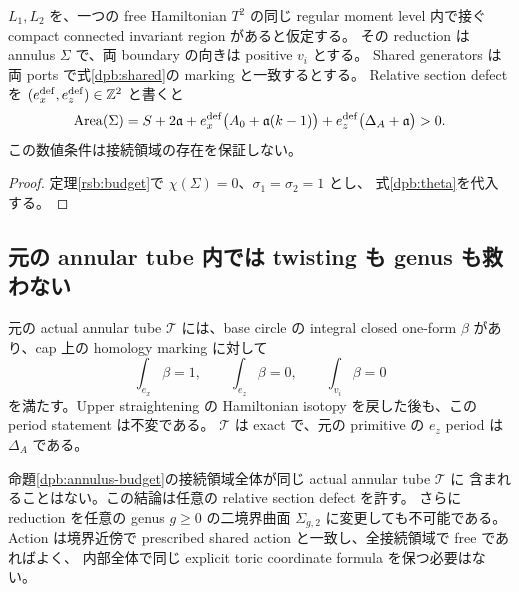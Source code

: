 \begin{proposition}\label{dpb:annulus-budget}
$L_1,L_2$ を、一つの free Hamiltonian $T^2$ の同じ regular moment level 内で接ぐ
compact connected invariant region があると仮定する。
その reduction は annulus $\Sigma$ で、両 boundary の向きは positive $v_i$ とする。
Shared generators は両 ports で式\eqref{dpb:shared}の marking と一致するとする。
Relative section defect を $(e_x^{\rm def},e_z^{\rm def})\in\mathbb Z^2$ と書くと
\begin{equation}\label{dpb:annulus-area}
 \operatorname{Area}(\Sigma)
 =S+2\mathfrak a
  +e_x^{\rm def}\bigl(A_0+\mathfrak a(k-1)\bigr)
  +e_z^{\rm def}\bigl(\Delta_A+\mathfrak a\bigr)>0.
\end{equation}
この数値条件は接続領域の存在を保証しない。
\end{proposition}

\begin{proof}
定理\ref{rsb:budget}で $\chi(\Sigma)=0$、$\sigma_1=\sigma_2=1$ とし、
式\eqref{dpb:theta}を代入する。
\end{proof}

\subsection{元の annular tube 内では twisting も genus も救わない}

元の actual annular tube $\mathcal T$ には、base circle の integral closed one-form
$\beta$ があり、cap 上の homology marking に対して
\begin{equation}\label{dpb:beta}
 \int_{e_x}\beta=1,\qquad \int_{e_z}\beta=0,
 \qquad \int_{v_i}\beta=0
\end{equation}
を満たす。Upper straightening の Hamiltonian isotopy を戻した後も、この period statement は不変である。
$\mathcal T$ は exact で、元の primitive の $e_z$ period は $\Delta_A$ である。

\begin{theorem}\label{dpb:tube}
命題\ref{dpb:annulus-budget}の接続領域全体が同じ actual annular tube $\mathcal T$ に
含まれることはない。この結論は任意の relative section defect を許す。
さらに reduction を任意の genus $g\ge0$ の二境界曲面 $\Sigma_{g,2}$ に変更しても不可能である。
Action は境界近傍で prescribed shared action と一致し、全接続領域で free であればよく、
内部全体で同じ explicit toric coordinate formula を保つ必要はない。
\end{theorem}

